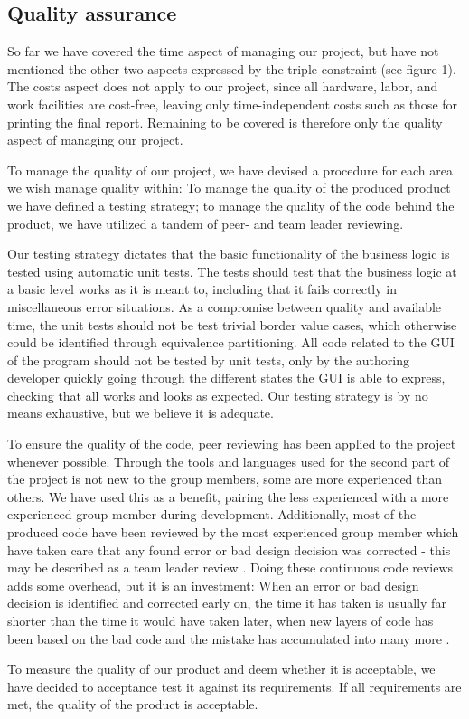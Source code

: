 \subsection{Quality assurance}

So far we have covered the time aspect of managing our project, but have not mentioned the other two aspects expressed by the triple constraint (see figure 1).
The costs aspect does not apply to our project, since all hardware, labor, and work facilities are cost-free, leaving only time-independent costs such as those for printing the final report.
Remaining to be covered is therefore only the quality aspect of managing our project.

To manage the quality of our project, we have devised a procedure for each area we wish manage quality within: To manage the quality of the produced product we have defined a testing strategy; to manage the quality of the code behind the product, we have utilized a tandem of peer- and team leader reviewing.

Our testing strategy dictates that the basic functionality of the business logic is tested using automatic unit tests. The tests should test that the business logic at a basic level works as it is meant to, including that it fails correctly in miscellaneous error situations.
As a compromise between quality and available time, the unit tests should not be test trivial border value cases, which otherwise could be identified through equivalence partitioning.
All code related to the GUI of the program should not be tested by unit tests, only by the authoring developer quickly going through the different states the GUI is able to express, checking that all works and looks as expected.
Our testing strategy is by no means exhaustive, but we believe it is adequate.

To ensure the quality of the code, peer reviewing has been applied to the project whenever possible. Through the tools and languages used for the second part of the project is not new to the group members, some are more experienced than others.
We have used this as a benefit, pairing the less experienced with a more experienced group member during development. Additionally, most of the produced code have been reviewed by the most experienced group member which have taken care that any found error or bad design decision was corrected - this may be described as a team leader review \cite[p. 199]{pm}.
Doing these continuous code reviews adds some overhead, but it is an investment: When an error or bad design decision is identified and corrected early on, the time it has taken is usually far shorter than the time it would have taken later, when new layers of code has been based on the bad code and the mistake has accumulated into many more \cite[p. 247]{?}.

To measure the quality of our product and deem whether it is acceptable, we have decided to acceptance test it against its requirements. If all requirements are met, the quality of the product is acceptable.